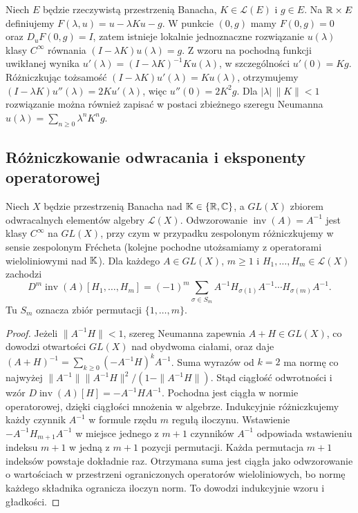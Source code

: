 \begin{przyklad}
\label{ex:implicit-operator15}
Niech $E$ będzie rzeczywistą przestrzenią Banacha, $K\in\mathcal L(E)$ i $g\in E$. Na $\mathbb R\times E$ definiujemy $F(\lambda,u)=u-\lambda Ku-g$. W punkcie $(0,g)$ mamy $F(0,g)=0$ oraz $D_uF(0,g)=I$, zatem istnieje lokalnie jednoznaczne rozwiązanie $u(\lambda)$ klasy $C^\infty$ równania $(I-\lambda K)u(\lambda)=g$. Z wzoru na pochodną funkcji uwikłanej wynika
$u'(\lambda)=(I-\lambda K)^{-1}Ku(\lambda)$, w szczególności $u'(0)=Kg$. Różniczkując tożsamość $(I-\lambda K)u'(\lambda)=Ku(\lambda)$, otrzymujemy $(I-\lambda K)u''(\lambda)=2Ku'(\lambda)$, więc $u''(0)=2K^2g$. Dla $|\lambda|\,\|K\|<1$ rozwiązanie można również zapisać w postaci zbieżnego szeregu Neumanna $u(\lambda)=\sum_{n\ge0}\lambda^nK^ng$.
\end{przyklad}


\subsection{Różniczkowanie odwracania i eksponenty operatorowej}

\begin{twierdzenie}
\label{thm:inverse-derivatives15}
Niech $X$ będzie przestrzenią Banacha nad $\mathbb K\in\{\mathbb R,\mathbb C\}$,
a $GL(X)$ zbiorem odwracalnych elementów algebry
$\mathcal L(X)$. Odwzorowanie $\operatorname{inv}(A)=A^{-1}$
jest klasy $C^\infty$ na $GL(X)$, przy czym w przypadku zespolonym różniczkujemy w sensie zespolonym Frécheta (kolejne pochodne utożsamiamy z operatorami wieloliniowymi nad $\mathbb K$). Dla każdego $A\in GL(X)$, $m\ge1$ i $H_1,\ldots,H_m\in\mathcal L(X)$ zachodzi
\[
 D^m\operatorname{inv}(A)[H_1,\ldots,H_m]
 =(-1)^m\sum_{\sigma\in S_m}
 A^{-1}H_{\sigma(1)}A^{-1}\cdots H_{\sigma(m)}A^{-1}.
\]
Tu $S_m$ oznacza zbiór permutacji $\{1,\ldots,m\}$.
\end{twierdzenie}
\begin{proof}
Jeżeli $\|A^{-1}H\|<1$, szereg Neumanna zapewnia $A+H\in GL(X)$, co dowodzi otwartości $GL(X)$ nad obydwoma ciałami, oraz daje
$(A+H)^{-1}=\sum_{k\ge0}(-A^{-1}H)^k A^{-1}$.
Suma wyrazów od $k=2$ ma normę co najwyżej
$\|A^{-1}\|\|A^{-1}H\|^2/(1-\|A^{-1}H\|)$.
Stąd ciągłość odwrotności i wzór
$D\operatorname{inv}(A)[H]=-A^{-1}HA^{-1}$.
Pochodna jest ciągła w normie operatorowej, dzięki
ciągłości mnożenia w algebrze. Indukcyjnie różniczkujemy
każdy czynnik $A^{-1}$ w formule rzędu $m$ regułą
iloczynu. Wstawienie $-A^{-1}H_{m+1}A^{-1}$ w miejsce
jednego z $m+1$ czynników $A^{-1}$ odpowiada wstawieniu
indeksu $m+1$ w jedną z $m+1$ pozycji permutacji.
Każda permutacja $m+1$ indeksów powstaje dokładnie raz.
Otrzymana suma jest ciągła jako odwzorowanie o wartościach
w przestrzeni ograniczonych operatorów wieloliniowych,
bo normę każdego składnika ogranicza iloczyn norm.
To dowodzi indukcyjnie wzoru i gładkości.
\end{proof}

